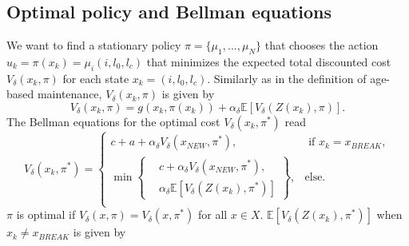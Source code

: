 \subsection{Optimal policy and Bellman equations}
We want to find a stationary policy $\pi= \{\mu_1,...,\mu_N\}$ that chooses the action $u_k=\pi(x_k)=\mu_i(i,l_0,l_c)$ that minimizes the expected total discounted cost $V_\delta(x_k,\pi)$ for each state $x_k=(i,l_0,l_c)$.
Similarly as in the definition of age-based maintenance, $V_\delta(x_k,\pi)$ is given by
\[V_\delta(x_k,\pi)=g(x_k,\pi(x_k))+\alpha_\delta \mathbb{E}[V_\delta(Z(x_k),\pi)].\]
The Bellman equations for the optimal cost $V_\delta(x_k,\pi^*)$ read
\begin{equation}\label{eq:MmfmBellman}
V_\delta(x_k,\pi^*)=\begin{cases}
c+a+\alpha_\delta V_\delta(x_{NEW},\pi^*),&\text{ if }x_k=x_{BREAK},\\
\min\left\{\begin{split}&c+\alpha_\delta V_\delta(x_{NEW},\pi^*),\\&\alpha_\delta \mathbb{E}[V_\delta(Z(x_k),\pi^*)]\end{split}\right\},&\text{else.}\\
\end{cases}
\end{equation}
$\pi$ is optimal if $V_\delta(x,\pi)=V_\delta(x,\pi^*)$ for all $x\in X$.
$\mathbb{E}[V_\delta(Z(x_k),\pi^*)]$ when $x_k\neq x_{BREAK}$ is given by 
